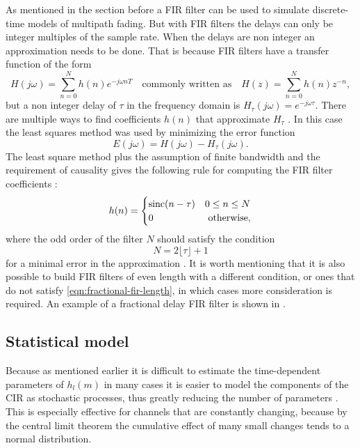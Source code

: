 As mentioned in the section before a FIR filter can be used to simulate discrete-time models of multipath fading. But with FIR filters the delays can only be integer multiples of the sample rate. When the delays are non integer an approximation needs to be done. That is because FIR filters have a transfer function of the form
\begin{equation} \label{eqn:transfer-function-fir}
	H(j\omega) = \sum_{n = 0}^{N} h(n) e^{-j\omega nT}
	\quad \text{commonly written as} \quad
	H(z) = \sum_{n = 0}^{N} h(n) z^{-n},
\end{equation}
but a non integer delay of \(\tau\) in the frequency domain is \(H_\tau(j\omega) = e^{-j\omega \tau}\). There are multiple ways to find coefficients \(h(n)\) that approximate \(H_\tau\) \cite{Valimaki1995}. In this case the least squares method was used by minimizing the error function
\begin{equation}
	E(j\omega) = H(j\omega) - H_\tau(j\omega).
\end{equation}
The least square method plus the assumption of finite bandwidth and the requirement of causality gives the following rule for computing the FIR filter coefficients \cite{Valimaki1995}:
\begin{equation}
	h(n)= \begin{cases}
		\operatorname{sinc} (n - \tau) & 0 \leq n \leq N \\ 
		0 & \text { otherwise},
	\end{cases}
\end{equation}
where the odd order of the filter \(N\) should satisfy the condition
\begin{equation} \label{eqn:fractional-fir-length}
	N = 2 \lfloor \tau \rfloor + 1
\end{equation}
for a minimal error in the approximation \cite{Valimaki1995}. It is worth mentioning that it is also possible to build FIR filters of even length with a different condition, or ones that do not satisfy \eqref{eqn:fractional-fir-length}, in which cases more consideration is required. An example of a fractional delay FIR filter is shown in .

\subsection{Statistical model} \label{sec:statistical-model}

Because as mentioned earlier it is difficult to estimate the time-dependent parameters of \(h_l(m)\) in many cases it is easier to model the components of the CIR as stochastic processes, thus greatly reducing the number of parameters \cite{Messier,Mathis}. This is especially effective for channels that are constantly changing, because by the central limit theorem the cumulative effect of many small changes tends to a normal distribution.

